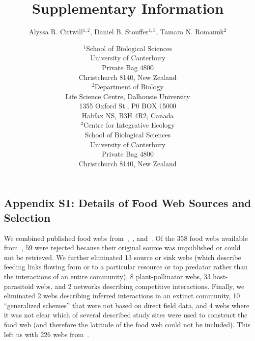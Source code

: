 \documentclass[12pt]{article}
\newcommand{\beginsupplement}{%
        \setcounter{table}{0}
        \renewcommand{\thetable}{S\arabic{table}}%
        \setcounter{figure}{0}
        \renewcommand{\thefigure}{S\arabic{figure}}%
     }
\begin{document}
\title{Supplementary Information}
\author{Alyssa R. Cirtwill$^{1,2}$, Daniel B. Stouffer$^{1,3}$, Tamara N. Romanuk$^{2}$}
\date{\small$^1$School of Biological Sciences\\University of Canterbury\\
Private Bag 4800\\Christchurch 8140, New Zealand \\
\medskip$^2$Department of Biology\\
Life Science Centre, Dalhousie University\\1355 Oxford St., P0 BOX 15000\\
Halifax NS, B3H 4R2, Canada\\
\medskip$^3$Centre for Integrative Ecology\\School of Biological Sciences\\University of Canterbury\\
Private Bag 4800\\Christchurch 8140, New Zealand \\}



\maketitle
\baselineskip=8.5mm

\vspace{0.4 in}
\beginsupplement
\subsection*{Appendix S1: Details of Food Web Sources and Selection}

  We combined published food webs from~\citet{GlobaWeb},~\citet{Riede2011},
  and~\citet{Dunne2013}. Of the 358 food webs available
  from~\citet{Globalweb}, 59 were rejected because their original source was
  unpublished or could not be retrieved. We further eliminated 13 source or
  sink webs (which describe feeding links flowing from or to a particular
  resource or top predator rather than the interactions of an entire
  community), 8 plant-pollinator webs, 33 host-parasitoid webs, and 2 networks
  describing competitive interactions. Finally, we eliminated 2 webs
  describing  inferred interactions in an extinct community, 10 ``generalized
  schemes'' that were not based on direct field data, and 4 webs where it was
  not clear which of several described study sites were used to construct the
  food web (and therefore the latitude of the food web could not be
  included). This left us with 226 webs from~\citet{GlobalWeb}.
\end{document}
